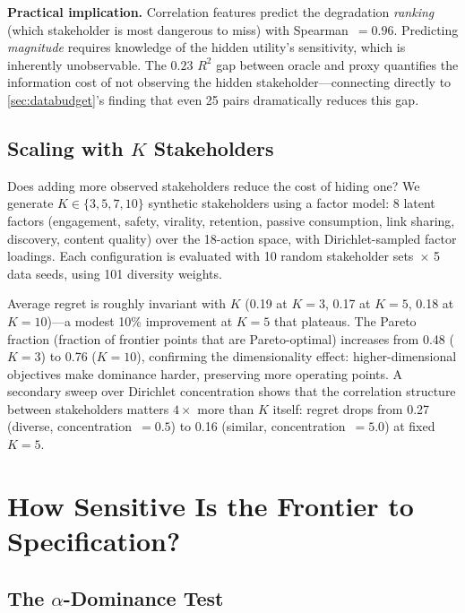 \documentclass[11pt,letterpaper]{article}
\begin{document}
\textbf{Practical implication.} Correlation features predict the
degradation \emph{ranking} (which stakeholder is most dangerous to
miss) with Spearman~$= 0.96$. Predicting \emph{magnitude} requires
knowledge of the hidden utility's sensitivity, which is inherently
unobservable. The $0.23$ $R^2$ gap between oracle and proxy
quantifies the information cost of not observing the hidden
stakeholder---connecting directly to \cref{sec:databudget}'s finding
that even 25 pairs dramatically reduces this gap.

\subsection{Scaling with $K$ Stakeholders}

Does adding more observed stakeholders reduce the cost of hiding one?
We generate $K \in \{3, 5, 7, 10\}$ synthetic stakeholders using a
factor model: 8 latent factors (engagement, safety, virality,
retention, passive consumption, link sharing, discovery, content
quality) over the 18-action space, with Dirichlet-sampled factor
loadings. Each configuration is evaluated with 10 random stakeholder
sets~$\times$ 5 data seeds, using 101 diversity weights.

Average regret is roughly invariant with $K$ (0.19 at $K=3$, 0.17
at $K=5$, 0.18 at $K=10$)---a modest 10\% improvement at $K=5$
that plateaus. The Pareto fraction (fraction of frontier points that
are Pareto-optimal) increases from 0.48 ($K=3$) to 0.76 ($K=10$),
confirming the dimensionality effect: higher-dimensional objectives
make dominance harder, preserving more operating points. A secondary
sweep over Dirichlet concentration shows that the correlation
structure between stakeholders matters $4\times$ more than $K$
itself: regret drops from 0.27 (diverse, concentration~$= 0.5$) to
0.16 (similar, concentration~$= 5.0$) at fixed $K=5$.

\section{How Sensitive Is the Frontier to Specification?}
\label{sec:sensitivity}

\subsection{The $\alpha$-Dominance Test}
\end{document}
